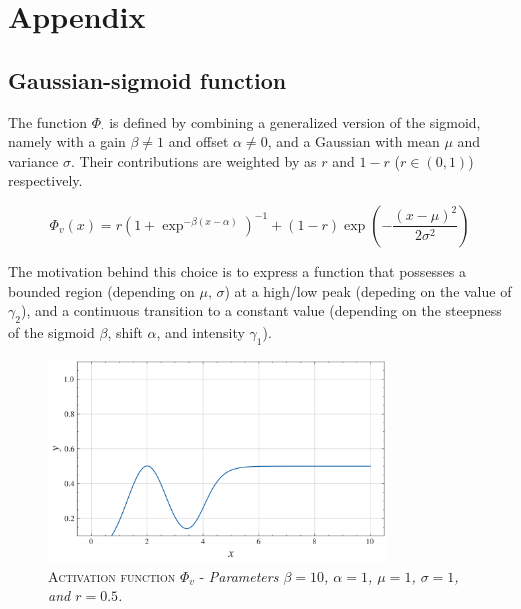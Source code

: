 
\section{Appendix}\label{sec:appendix}


\subsection{Gaussian-sigmoid function}
\noindent The function $\Phi_{\cdot}$ is defined by combining a generalized version of the sigmoid, namely with a gain $\beta \neq 1$ and offset $\alpha\neq 0$, and a Gaussian with mean $\mu$ and variance $\sigma$. Their contributions are weighted by as $r$ and $1-r$ ($r\in(0,1)$) respectively.

\begin{equation*}
    \Phi_v(x) = r\left(1 + \exp^{-\beta(x-\alpha)}\right)^{-1} + (1-r)\exp\left(-\frac{(x-\mu)^2}{2\sigma^2}\right)
\end{equation*}

\noindent The motivation behind this choice is to express a function that possesses a bounded region (depending on $\mu,\,\sigma$) at a high/low peak (depeding on the value of $\gamma_{2}$), and a continuous transition to a constant value (depending on the steepness of the sigmoid $\beta$, shift
$\alpha$, and intensity $\gamma_{1}$).

\begin{figure}[ht]
    \centering
    \includegraphics[width=0.8\textwidth]{figures/gaussian_sigmoid.png}
    \caption{\textsc{Activation function $\Phi_{v}$} - \textit{Parameters $\beta=10$, $\alpha=1$, $\mu=1$, $\sigma=1$, and $r=0.5$.}}
    \label{fig:gau_sigm}
\end{figure}



